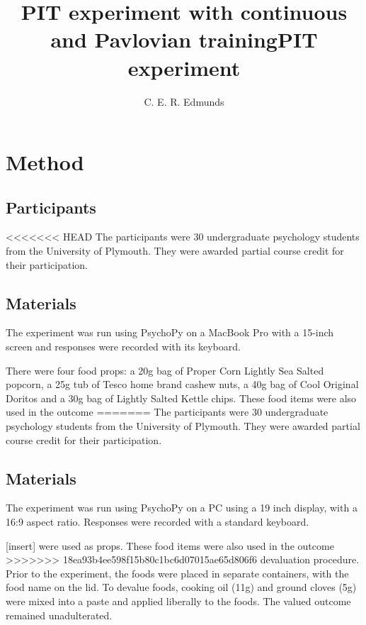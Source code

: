\documentclass[12pt]{article}
\title{PIT experiment with continuous and Pavlovian training}
\title{PIT experiment}
\author{C. E. R. Edmunds}
\date{}%
\begin{document}

\newpage
\doublespacing

\section{Method}
\subsection{Participants}
<<<<<<< HEAD
The participants were 30 undergraduate psychology students from the University of Plymouth. They were awarded partial course credit for their participation. 

\subsection{Materials}
The experiment was run using PsychoPy \cite{Peirce2007, Peirce2009} on a 
MacBook Pro with a 15-inch screen and responses were recorded with
its keyboard.

There were four food props: a 20g bag of Proper Corn Lightly Sea Salted popcorn, a 25g tub of Tesco home brand cashew nuts, a 40g bag of Cool Original Doritos and a 30g bag of Lightly Salted Kettle chips. These food items were also used in the outcome
=======
The participants were $30$ undergraduate psychology students from the
University of Plymouth. They were awarded partial course credit for their
participation. 

\subsection{Materials}
The experiment was run using PsychoPy \cite{Peirce2007, Peirce2009} on a PC
using a 19 inch display, with a 16:9 aspect ratio. Responses were recorded with
a standard keyboard.

[insert] were used as props. These food items were also used in the outcome
>>>>>>> 18ea93b4ee598f15b80c1bc6d07015ae65d806f6
devaluation procedure. Prior to the experiment, the foods were placed in
separate containers, with the food name on the lid. To devalue foods, cooking
oil (11g) and ground cloves (5g) were mixed into a paste and applied liberally
to the foods. The valued outcome remained unadulterated. 
\end{document}
